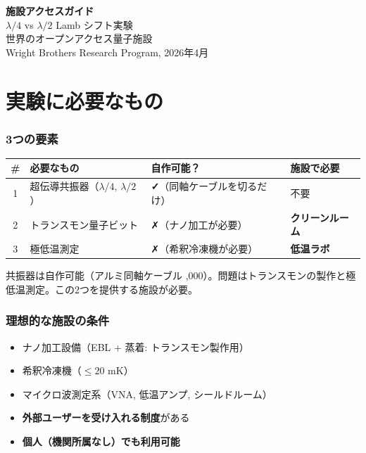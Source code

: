 \documentclass[12pt,a4paper]{article}
\begin{document}
\begin{center}
{\Huge\bfseries 施設アクセスガイド}\\[0.5cm]
{\Large $\lambda/4$ vs $\lambda/2$ Lamb シフト実験}\\[0.3cm]
{\Large 世界のオープンアクセス量子施設}\\[1cm]
{\large Wright Brothers Research Program, 2026年4月}
\end{center}

\vspace{0.5cm}
\tableofcontents
\newpage

\part{実験に必要なもの}

\section{3つの要素}

\begin{center}
\renewcommand{\arraystretch}{1.5}
\begin{tabular}{clll}
\toprule
\# & 必要なもの & 自作可能？ & 施設で必要 \\
\midrule
1 & 超伝導共振器（$\lambda/4$, $\lambda/2$） & \textbf{✓}（同軸ケーブルを切るだけ） & 不要 \\
2 & トランスモン量子ビット & ✗（ナノ加工が必要） & \textbf{クリーンルーム} \\
3 & 極低温測定 & ✗（希釈冷凍機が必要） & \textbf{低温ラボ} \\
\bottomrule
\end{tabular}
\end{center}

共振器は自作可能（アルミ同軸ケーブル ,000）。問題はトランスモンの製作と極低温測定。この2つを提供する施設が必要。

\section{理想的な施設の条件}

\begin{itemize}
\item ナノ加工設備（EBL + 蒸着: トランスモン製作用）
\item 希釈冷凍機（$\leq 20$ mK）
\item マイクロ波測定系（VNA, 低温アンプ, シールドルーム）
\item \textbf{外部ユーザーを受け入れる制度}がある
\item \textbf{個人（機関所属なし）でも利用可能}
\end{itemize}
\end{document}
